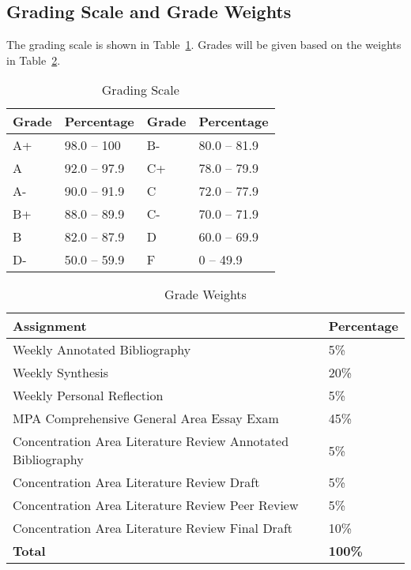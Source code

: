 \documentclass[12pt, letterpaper]{article}
\begin{document}
\subsection*{Grading Scale and Grade Weights}  

The grading scale is shown in Table~\ref{tab:grading-scale}. Grades will be given based on the weights in Table~\ref{tab:grade-weights}.

\begin{table}[h]
\centering
\caption{Grading Scale}
\begin{tabular}{llll}
\toprule
\textbf{Grade} & \textbf{Percentage} & \textbf{Grade} & \textbf{Percentage} \\
\midrule
A+ & 98.0 -- 100 & B- & 80.0 -- 81.9\\
A & 92.0 -- 97.9 & C+ & 78.0 -- 79.9\\
A- & 90.0 -- 91.9 & C & 72.0 -- 77.9\\
B+ & 88.0 -- 89.9 & C- & 70.0 -- 71.9\\
B & 82.0 -- 87.9 & D & 60.0 -- 69.9\\
D- & 50.0 -- 59.9 & F & 0 -- 49.9\\

\bottomrule
\end{tabular}
\label{tab:grading-scale}
\end{table}


\begin{table}[h!]
\centering
\caption{Grade Weights}
\begin{tabular}{ll}
    \toprule
\textbf{Assignment} & \textbf{Percentage} \\
\midrule
Weekly Annotated Bibliography & 5\% \\
Weekly Synthesis & 20\% \\
Weekly Personal Reflection & 5\% \\
MPA Comprehensive General Area Essay Exam & 45\% \\
Concentration Area Literature Review Annotated Bibliography & 5\% \\
Concentration Area Literature Review Draft & 5\% \\
Concentration Area Literature Review Peer Review & 5\% \\
Concentration Area Literature Review Final Draft & 10\% \\
\midrule
\textbf{Total} & \textbf{100\%} \\
\bottomrule
\end{tabular}
\label{tab:grade-weights}
\end{table}
\end{document}
